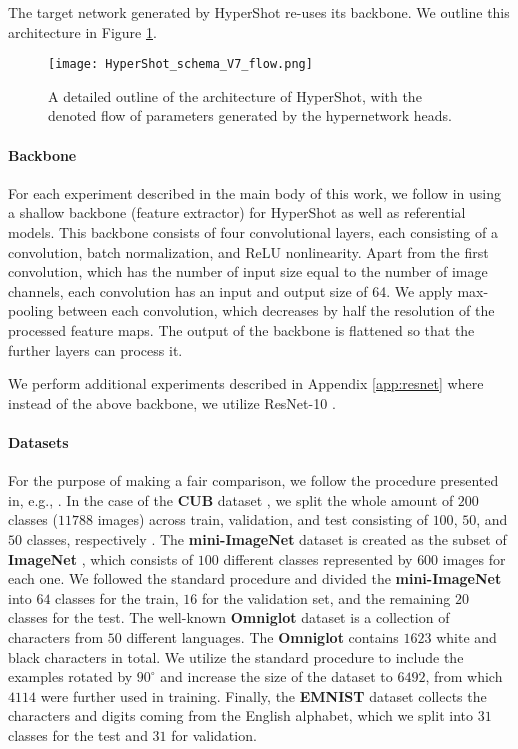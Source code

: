 \documentclass[nohyperref]{article}
\def\our{HyperShot}
\theoremstyle{plain}
\theoremstyle{definition}
\theoremstyle{remark}
\begin{document}
    The target network generated by \our{} re-uses its backbone. We outline this architecture in Figure \ref{fig:schema_flow}.
    
    \begin{figure}
        \centering
        \texttt{[image: HyperShot\_schema\_V7\_flow.png]}
        \caption{A detailed outline of the architecture of \our{}, with the denoted flow of parameters generated by the hypernetwork heads.
        }
        \label{fig:schema_flow}
    \end{figure}
    
\paragraph{Backbone}
    For each experiment described in the main body of this work, we follow  \cite{patacchiola2020bayesian} in using a shallow backbone (feature extractor) for \our{} as well as referential models. This backbone consists of four convolutional layers, each consisting of a convolution, batch normalization, and ReLU nonlinearity. Apart from the first convolution, which has the number of input size equal to the number of image channels, each convolution has an input and output size of 64. We apply max-pooling between each convolution, which decreases by half the resolution of the processed feature maps. The output of the backbone is flattened so that the further layers can process it.
    
    We perform additional experiments described in Appendix \ref{app:resnet} where instead of the above backbone, we utilize ResNet-10 \cite{he2015resnet}.
    
\paragraph{Datasets}
    For the purpose of making a fair comparison, we follow the procedure presented in, e.g., \cite{patacchiola2020bayesian,chen2019closer}. In the case of the \textbf{CUB} dataset \cite{wah2011cub}, we split the whole amount of $200$ classes ($11788$ images) across train, validation, and test consisting of $100$, $50$, and $50$ classes, respectively \cite{chen2019closer}. The \textbf{mini-ImageNet} dataset \cite{ravi2016optimization} is created as the subset of \textbf{ImageNet} \cite{russakovsky2015imagenet}, which consists of $100$ different classes represented by $600$ images for each one. We followed the standard procedure and divided the \textbf{mini-ImageNet} into $64$ classes for the train, $16$ for the validation set, and the remaining $20$ classes for the test. The well-known \textbf{Omniglot} dataset \cite{lake2011one} is a collection of characters from $50$ different languages. The \textbf{Omniglot} contains $1623$ white and black characters in total. We utilize the standard procedure to include the examples rotated by $90^\circ$ and increase the size of the dataset to $6492$, from which $4114$ were further used in training. Finally, the \textbf{EMNIST} dataset \cite{cohen2017emnist} collects the characters and digits coming from the English alphabet, which we split into $31$ classes for the test and $31$ for validation.
    
\end{document}
